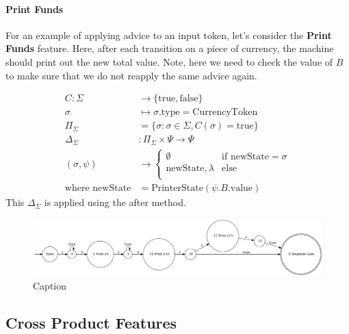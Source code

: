 \documentclass[sigplan,anonymous,review]{acmart}
\begin{document}
\paragraph{Print Funds} For an example of applying advice to an input token, let's consider the \textbf{Print Funds} feature. Here, after each transition on a piece of currency, the machine should print out the new total value. Note, here we need to check the value of $B$ to make sure that we do not reapply the same advice again.

\begin{align*}
C: \Sigma &\rightarrow \{\mathrm{true},\mathrm{false}\}\\
\sigma &\mapsto \sigma.\text{type} = \text{CurrencyToken} \\
\Pi_\Sigma &= \{\sigma: \sigma \in \Sigma, C(\sigma) = \mathrm{true}\}\\
\Delta_\Sigma &: \Pi_\Sigma \times \Psi \rightarrow \Psi\\
(\sigma, \psi) &\rightarrow \begin{cases}
    \emptyset & \text{if newState} = \sigma\\
    \text{newState}, \lambda & \text{else}\\
\end{cases}\\
\text{where newState} &= \text{PrinterState}(\psi.B.\text{value})
\end{align*}
This $\Delta_\Sigma$ is applied using the after method.

\begin{figure}
    \centering
    \includegraphics[width=\textwidth]{figures/vend3.pdf}
    \caption{Caption}
    \label{fig:my_label}
\end{figure}

\subsection{Cross Product Features}
\end{document}
